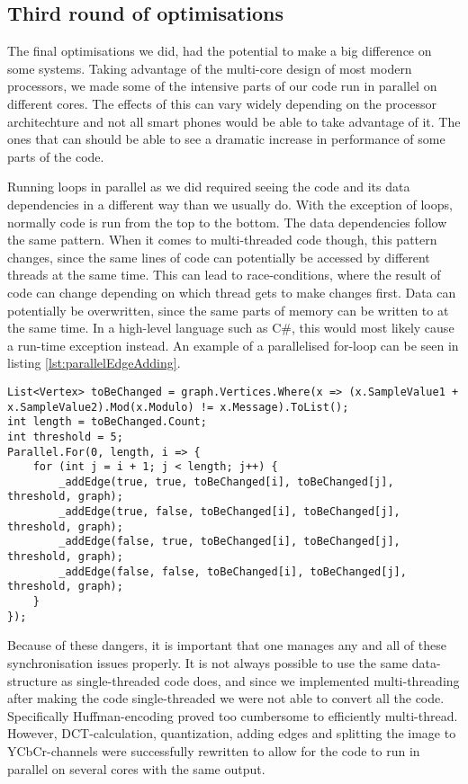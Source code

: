 \subsection{Third round of optimisations}
The final optimisations we did, had the potential to make a big difference on some systems.
Taking advantage of the multi-core design of most modern processors, we made some of the intensive parts of our code run in parallel on different cores.
The effects of this can vary widely depending on the processor architechture and not all smart phones would be able to take advantage of it.
The ones that can should be able to see a dramatic increase in performance of some parts of the code.

Running loops in parallel as we did required seeing the code and its data dependencies in a different way than we usually do.
With the exception of loops, normally code is run from the top to the bottom.
The data dependencies follow the same pattern.
When it comes to multi-threaded code though, this pattern changes, since the same lines of code can potentially be accessed by different threads at the same time.
This can lead to race-conditions, where the result of code can change depending on which thread gets to make changes first.
Data can potentially be overwritten, since the same parts of memory can be written to at the same time.
In a high-level language such as C\#, this would most likely cause a run-time exception instead.
An example of a parallelised for-loop can be seen in listing \ref{lst:parallelEdgeAdding}.

\begin{lstlisting}[firstnumber=677,label=lst:parallelEdgeAdding, caption={Parallelisation of the algorithm for adding edges to the graph.}]
List<Vertex> toBeChanged = graph.Vertices.Where(x => (x.SampleValue1 + x.SampleValue2).Mod(x.Modulo) != x.Message).ToList();
int length = toBeChanged.Count;
int threshold = 5;
Parallel.For(0, length, i => {
    for (int j = i + 1; j < length; j++) {
        _addEdge(true, true, toBeChanged[i], toBeChanged[j], threshold, graph);
        _addEdge(true, false, toBeChanged[i], toBeChanged[j], threshold, graph);
        _addEdge(false, true, toBeChanged[i], toBeChanged[j], threshold, graph);
        _addEdge(false, false, toBeChanged[i], toBeChanged[j], threshold, graph);
    }
});
\end{lstlisting}

Because of these dangers, it is important that one manages any and all of these synchronisation issues properly.
It is not always possible to use the same data-structure as single-threaded code does, and since we implemented multi-threading after making the code single-threaded we were not able to convert all the code.
Specifically Huffman-encoding proved too cumbersome to efficiently multi-thread.
However, DCT-calculation, quantization, adding edges and splitting the image to YCbCr-channels were successfully rewritten to allow for the code to run in parallel on several cores with the same output.

